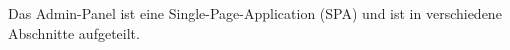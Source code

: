 Das Admin-Panel ist eine Single-Page-Application (SPA) und ist in verschiedene Abschnitte aufgeteilt.